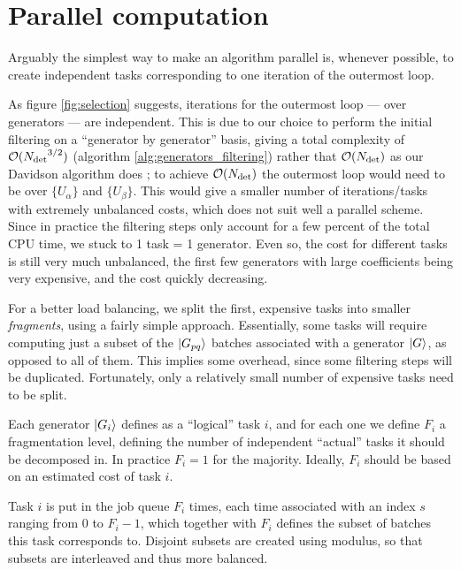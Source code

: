 \documentclass[./thesis.tex]{subfiles}
\begin{document}
\section{Parallel computation}

Arguably the simplest way to make an algorithm parallel is, whenever possible, to create independent tasks corresponding to one iteration of the outermost loop. 

As figure \ref{fig:selection} suggests, iterations for the outermost loop --- over generators --- are independent. This is due to our choice to perform the initial filtering on a ``generator by generator'' basis, giving a total complexity of $\mathcal{O}({N_\text{det}}^{3/2})$ (algorithm \ref{alg:generators_filtering}) rather that $\mathcal{O}({N_\text{det}})$ as our Davidson algorithm does ; to achieve $\mathcal{O}({N_\text{det}})$ the outermost loop would need to be over $\{U_\alpha\}$ and $\{U_\beta\}$. This would give a smaller number of iterations/tasks with extremely unbalanced costs, which does not suit well a parallel scheme. Since in practice the filtering steps only account for a few percent of the total CPU time, we stuck to 1 task = 1 generator. Even so, the cost for different tasks is still very much unbalanced, the first few generators with large coefficients being very expensive, and the cost quickly decreasing.

For a better load balancing, we split the first, expensive tasks into smaller \emph{fragments}, using a fairly simple approach. Essentially, some tasks will require computing just a subset of the $\ket {G_{pq}}$ batches associated with a generator $\ket G$, as opposed to all of them. This implies some overhead, since some filtering steps will be duplicated. Fortunately, only a relatively small number of expensive tasks need to be split.



Each generator $\ket {G_i}$ defines as a ``logical'' task $i$, and for each one we define $F_i$ a fragmentation level, defining the number of independent ``actual'' tasks it should be decomposed in. In practice $F_i = 1$ for the majority. Ideally, $F_i$ should be based on an estimated cost of task $i$. 

Task $i$ is put in the job queue $F_i$ times, each time associated with an index $s$ ranging from $0$ to $F_i-1$, which together with $F_i$ defines the subset of batches this task corresponds to. Disjoint subsets are created using modulus, so that subsets are interleaved and thus more balanced.
 
\end{document}
